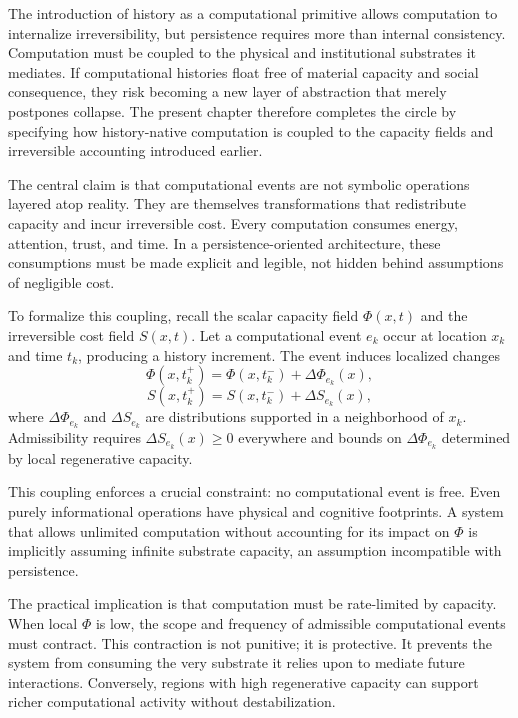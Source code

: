\documentclass[12pt,oneside]{book}
\begin{document}
The introduction of history as a computational primitive allows computation to internalize irreversibility, but persistence requires more than internal consistency. Computation must be coupled to the physical and institutional substrates it mediates. If computational histories float free of material capacity and social consequence, they risk becoming a new layer of abstraction that merely postpones collapse. The present chapter therefore completes the circle by specifying how history-native computation is coupled to the capacity fields and irreversible accounting introduced earlier.

The central claim is that computational events are not symbolic operations layered atop reality. They are themselves transformations that redistribute capacity and incur irreversible cost. Every computation consumes energy, attention, trust, and time. In a persistence-oriented architecture, these consumptions must be made explicit and legible, not hidden behind assumptions of negligible cost.

To formalize this coupling, recall the scalar capacity field \(\Phi(x,t)\) and the irreversible cost field \(S(x,t)\). Let a computational event \(e_k\) occur at location \(x_k\) and time \(t_k\), producing a history increment. The event induces localized changes
\[
\Phi(x,t_k^+) = \Phi(x,t_k^-) + \Delta \Phi_{e_k}(x),
\]
\[
S(x,t_k^+) = S(x,t_k^-) + \Delta S_{e_k}(x),
\]
where \(\Delta \Phi_{e_k}\) and \(\Delta S_{e_k}\) are distributions supported in a neighborhood of \(x_k\). Admissibility requires \(\Delta S_{e_k}(x) \geq 0\) everywhere and bounds on \(\Delta \Phi_{e_k}\) determined by local regenerative capacity.

This coupling enforces a crucial constraint: no computational event is free. Even purely informational operations have physical and cognitive footprints. A system that allows unlimited computation without accounting for its impact on \(\Phi\) is implicitly assuming infinite substrate capacity, an assumption incompatible with persistence.

The practical implication is that computation must be rate-limited by capacity. When local \(\Phi\) is low, the scope and frequency of admissible computational events must contract. This contraction is not punitive; it is protective. It prevents the system from consuming the very substrate it relies upon to mediate future interactions. Conversely, regions with high regenerative capacity can support richer computational activity without destabilization.
\end{document}
